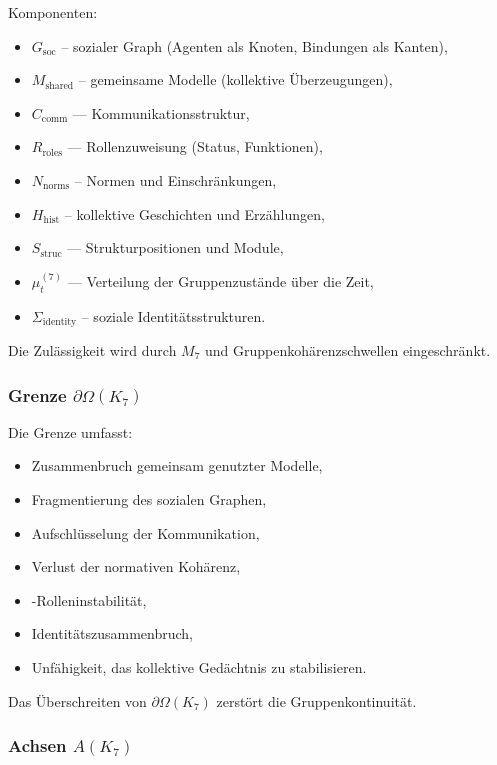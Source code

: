 Komponenten:
\begin{itemize}
    \item $G_{\mathrm{soc}}$ – sozialer Graph (Agenten als Knoten, Bindungen als Kanten),
    \item $M_{\mathrm{shared}}$ – gemeinsame Modelle (kollektive Überzeugungen),
    \item $C_{\mathrm{comm}}$ — Kommunikationsstruktur,
    \item $R_{\mathrm{roles}}$ — Rollenzuweisung (Status, Funktionen),
    \item $N_{\mathrm{norms}}$ – Normen und Einschränkungen,
    \item $H_{\mathrm{hist}}$ – kollektive Geschichten und Erzählungen,
    \item $S_{\mathrm{struc}}$ — Strukturpositionen und Module,
    \item $\mu^{(7)}_t$ — Verteilung der Gruppenzustände über die Zeit,
    \item $\Sigma_{\mathrm{identity}}$ – soziale Identitätsstrukturen.
\end{itemize}

Die Zulässigkeit wird durch $M_7$ und Gruppenkohärenzschwellen eingeschränkt.

\subsubsection{Grenze \texorpdfstring{$\partial\Omega(K_7)$}{\partial\Omega(K_7)}}

Die Grenze umfasst:
\begin{itemize}
    \item Zusammenbruch gemeinsam genutzter Modelle,
    \item Fragmentierung des sozialen Graphen,
    \item Aufschlüsselung der Kommunikation,
    \item Verlust der normativen Kohärenz,
    \item-Rolleninstabilität,
    \item Identitätszusammenbruch,
    \item Unfähigkeit, das kollektive Gedächtnis zu stabilisieren.
\end{itemize}

Das Überschreiten von $\partial\Omega(K_7)$ zerstört die Gruppenkontinuität.

\subsubsection{Achsen \texorpdfstring{$A(K_7)$}{A(K_7)}}

